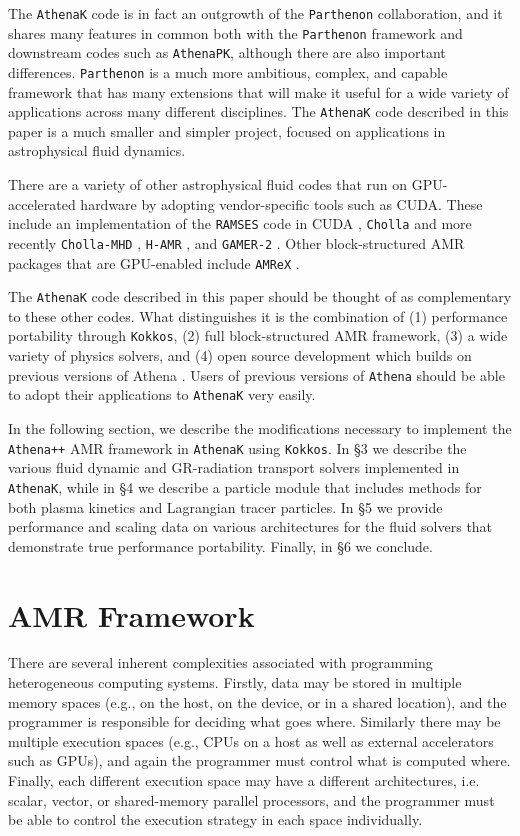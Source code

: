 \documentclass[twocolumn, floatfix]{aastex63}
\newcommand{\app}{\texttt{Athena++}}
\newcommand{\ak}{\texttt{AthenaK}}
\newcommand{\kokkos}{\texttt{Kokkos}}
\newcommand{\parth}{\texttt{Parthenon}}
\begin{document}
The \ak{} code is in fact an outgrowth of the \parth{} collaboration, and it shares many features in common both with the \parth{} framework and downstream codes such as \texttt{AthenaPK}, although there are also important differences. \parth{} is a much more ambitious, complex, and capable framework that has many extensions that will make it useful for a wide variety of applications across many different disciplines. The \ak{} code described in this paper is a much smaller and simpler project, focused on applications in astrophysical fluid dynamics. 

There are a variety of other astrophysical fluid codes that run on GPU-accelerated hardware by adopting vendor-specific tools such as CUDA.  These include an implementation of the \texttt{RAMSES} code in CUDA \citep{kestener2017ascl.soft10013K}, \texttt{Cholla} \citep{schneider2015ApJS..217...24S} and more recently \texttt{Cholla-MHD} \citep{caddy2024ApJ...970...44C}, \texttt{H-AMR} \citep{liska2022ApJS..263...26L}, and \texttt{GAMER-2} \citep{schive2018MNRAS.481.4815S}.  Other block-structured AMR packages that are GPU-enabled include \texttt{AMReX} \citep{zhang2019JOSS....4.1370Z}.

The \ak{} code described in this paper should be thought of as complementary to these other codes.
What distinguishes it is the combination of (1) performance portability through \kokkos{}, (2) full block-structured AMR framework, (3) a wide variety of physics solvers, and (4) open source development which builds on previous versions of Athena \citep[hereafter S08]{Stone+2008}.  Users of previous versions of \texttt{Athena} should be able to adopt their applications to \ak{} very easily.

In the following section, we describe the modifications necessary to
implement the \app{} AMR framework in \ak{} using \kokkos{}.  In \S3 we describe the various fluid dynamic and GR-radiation transport solvers implemented in \ak{}, while in \S4 we describe a particle module that includes methods for both plasma kinetics and Lagrangian tracer particles. In \S5 we provide performance and scaling data on various architectures for the fluid solvers that demonstrate true performance portability.  Finally, in \S6 we conclude.

\section{AMR Framework}

There are several inherent complexities associated with programming heterogeneous computing systems.  Firstly, data may be stored in multiple memory spaces (e.g., on the host, on the device, or in a shared location), and the programmer is responsible for deciding what goes where.  Similarly there may be multiple execution spaces (e.g., CPUs on a host as well as external accelerators such as GPUs), and again the programmer must control what is computed where.  Finally, each different execution space may have a different architectures, i.e. scalar, vector, or shared-memory parallel processors, and the programmer must be able to control the execution strategy in each space individually.  
\end{document}
